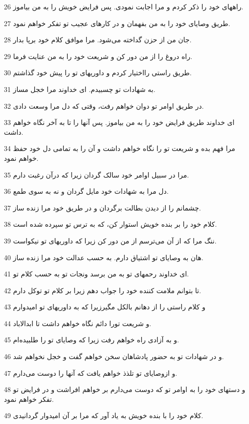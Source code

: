 \par 26 راههای خود را ذکر کردم و مرا اجابت نمودی. پس فرایض خویش را به من بیاموز.
\par 27 طریق وصایای خود را به من بفهمان و در کارهای عجیب تو تفکر خواهم نمود.
\par 28 جان من از حزن گداخته می‌شود. مرا موافق کلام خود برپا بدار.
\par 29 راه دروغ را از من دور کن و شریعت خود را به من عنایت فرما.
\par 30 طریق راستی رااختیار کردم و داوریهای تو را پیش خود گذاشتم.
\par 31 به شهادات تو چسبیدم. ای خداوند مرا خجل مساز.
\par 32 در طریق اوامر تو دوان خواهم رفت، وقتی که دل مرا وسعت دادی.
\par 33 ‌ای خداوند طریق فرایض خود را به من بیاموز. پس آنها را تا به آخر نگاه خواهم داشت.
\par 34 مرا فهم بده و شریعت تو را نگاه خواهم داشت و آن را به تمامی دل خود حفظ خواهم نمود.
\par 35 مرا در سبیل اوامر خود سالک گردان زیرا که درآن رغبت دارم.
\par 36 دل مرا به شهادات خود مایل گردان و نه به سوی طمع.
\par 37 چشمانم را از دیدن بطالت برگردان و در طریق خود مرا زنده ساز.
\par 38 کلام خود را بر بنده خویش استوار کن، که به ترس تو سپرده شده است.
\par 39 ننگ مرا که از آن می‌ترسم از من دور کن زیرا که داوریهای تو نیکواست.
\par 40 هان به وصایای تو اشتیاق دارم. به حسب عدالت خود مرا زنده ساز.
\par 41 ‌ای خداوند رحمهای تو به من برسد ونجات تو به حسب کلام تو.
\par 42 تا بتوانم ملامت کننده خود را جواب دهم زیرا بر کلام تو توکل دارم.
\par 43 و کلام راستی را از دهانم بالکل مگیرزیرا که به داوریهای تو امیدوارم
\par 44 و شریعت تورا دائم نگاه خواهم داشت تا ابدالاباد.
\par 45 و به آزادی راه خواهم رفت زیرا که وصایای تو را طلبیده‌ام.
\par 46 و در شهادات تو به حضور پادشاهان سخن خواهم گفت و خجل نخواهم شد.
\par 47 و ازوصایای تو تلذذ خواهم یافت که آنها را دوست می‌دارم.
\par 48 و دستهای خود را به اوامر تو که دوست می‌دارم بر خواهم افراشت و در فرایض تو تفکر خواهم نمود.
\par 49 کلام خود را با بنده خویش به یاد آور که مرا بر آن امیدوار گردانیدی.
